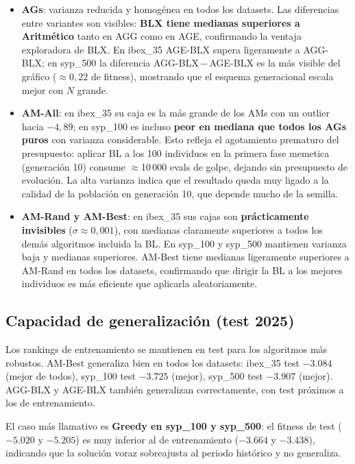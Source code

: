 \documentclass[12pt,a4paper]{article}
\begin{document}
\begin{itemize}
  \item \textbf{AGs}: varianza reducida y homogénea en todos los datasets. Las
  diferencias entre variantes son visibles: \textbf{BLX tiene medianas superiores a
  Aritmético} tanto en AGG como en AGE, confirmando la ventaja exploradora de BLX. En
  ibex\_35 AGE-BLX supera ligeramente a AGG-BLX; en syp\_500 la diferencia
  AGG-BLX\,$-$\,AGE-BLX es la más visible del gráfico ($\approx0{,}22$ de fitness),
  mostrando que el esquema generacional escala mejor con $N$ grande.

  \item \textbf{AM-All}: en ibex\_35 su caja es la más grande de los AMs con un
  outlier hacia $-4{,}89$; en syp\_100 es incluso \textbf{peor en mediana que todos los
  AGs puros} con varianza considerable. Esto refleja el agotamiento prematuro del
  presupuesto: aplicar BL a los 100 individuos en la primera fase memetica (generación
  10) consume $\approx$10\,000 evals de golpe, dejando sin presupuesto de evolución.
  La alta varianza indica que el resultado queda muy ligado a la calidad de la población
  en generación 10, que depende mucho de la semilla.

  \item \textbf{AM-Rand y AM-Best}: en ibex\_35 sus cajas son \textbf{prácticamente
  invisibles} ($\sigma\approx0{,}001$), con medianas claramente superiores a todos los
  demás algoritmos incluida la BL. En syp\_100 y syp\_500 mantienen varianza baja y
  medianas superiores. AM-Best tiene medianas ligeramente superiores a AM-Rand en todos
  los datasets, confirmando que dirigir la BL a los mejores individuos es más eficiente
  que aplicarla aleatoriamente.
\end{itemize}

\subsection{Capacidad de generalización (test 2025)}

Los rankings de entrenamiento se mantienen en test para los algoritmos más robustos.
AM-Best generaliza bien en todos los datasets: ibex\_35 test $-3.084$ (mejor de todos),
syp\_100 test $-3.725$ (mejor), syp\_500 test $-3.907$ (mejor). AGG-BLX y AGE-BLX
también generalizan correctamente, con test próximos a los de entrenamiento.

El caso más llamativo es \textbf{Greedy en syp\_100 y syp\_500}: el fitness de test
($-5.020$ y $-5.205$) es muy inferior al de entrenamiento ($-3.664$ y $-3.438$),
indicando que la solución voraz sobreajusta al periodo histórico y no generaliza.
\end{document}
